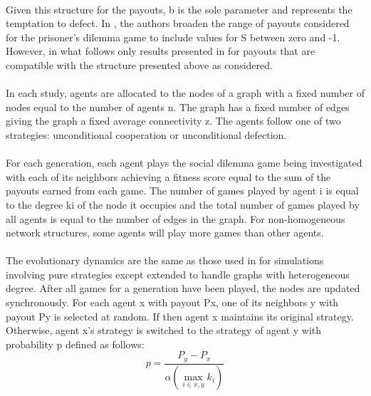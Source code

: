 \documentclass{article}
\begin{document}
    \paragraph{}Given this structure for the payouts, b is the sole parameter and represents the temptation to defect.  In \cite{Santos2006c}, the authors broaden the range of payouts considered for the prisoner's dilemma game to include values for S between zero and -1.  However, in what follows only results presented in \cite{Santos2006c} for payouts that are compatible with the structure presented above as considered.
    \paragraph{}In each study, agents are allocated to the nodes of a graph with a fixed number of nodes equal to the number of agents n.  The graph has a fixed number of edges giving the graph a fixed average connectivity z.  The agents follow one of two strategies: unconditional cooperation or unconditional defection.
    \paragraph{}For each generation, each agent plays the social dilemma game being investigated with each of its neighbors achieving a fitness score equal to the sum of the payouts earned from each game.  The number of games played by agent i is equal to the degree ki of the node it occupies and the total number of games played by all agents is equal to the number of edges in the graph.  For non-homogeneous network structures, some agents will play more games than other agents.
    \paragraph{}The evolutionary dynamics are the same as those used in \cite{Hauert2004} for simulations involving pure strategies except extended to handle graphs with heterogeneous degree.  After all games for a generation have been played, the nodes are updated synchronously.  For each agent x with payout Px, one of its neighbors y with payout Py is selected at random.  If  then agent x maintains its original strategy.  Otherwise, agent x's strategy is switched to the strategy of agent y with probability p defined as follows:
    \begin{equation}
    	p=\frac{P_y-P_x}{\alpha\left(\max_{i\in{x,y}}k_i\right)}
    \end{equation}
\end{document}
